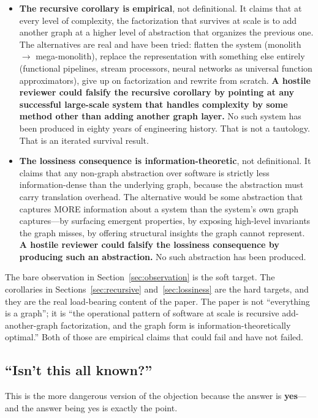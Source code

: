 \documentclass[11pt]{article}
\begin{document}
\begin{itemize}[leftmargin=*]
\item \textbf{The recursive corollary is empirical}, not definitional. It claims that at every level of complexity, the factorization that survives at scale is to add another graph at a higher level of abstraction that organizes the previous one. The alternatives are real and have been tried: flatten the system (monolith $\to$ mega-monolith), replace the representation with something else entirely (functional pipelines, stream processors, neural networks as universal function approximators), give up on factorization and rewrite from scratch. \textbf{A hostile reviewer could falsify the recursive corollary by pointing at any successful large-scale system that handles complexity by some method other than adding another graph layer.} No such system has been produced in eighty years of engineering history. That is not a tautology. That is an iterated survival result.
\item \textbf{The lossiness consequence is information-theoretic}, not definitional. It claims that any non-graph abstraction over software is strictly less information-dense than the underlying graph, because the abstraction must carry translation overhead. The alternative would be some abstraction that captures MORE information about a system than the system's own graph captures---by surfacing emergent properties, by exposing high-level invariants the graph misses, by offering structural insights the graph cannot represent. \textbf{A hostile reviewer could falsify the lossiness consequence by producing such an abstraction.} No such abstraction has been produced.
\end{itemize}

The bare observation in Section~\ref{sec:observation} is the soft target. The corollaries in Sections~\ref{sec:recursive} and~\ref{sec:lossiness} are the hard targets, and they are the real load-bearing content of the paper. The paper is not ``everything is a graph''; it is ``the operational pattern of software at scale is recursive add-another-graph factorization, and the graph form is information-theoretically optimal.'' Both of those are empirical claims that could fail and have not failed.

\subsection*{``Isn't this all known?''}

This is the more dangerous version of the objection because the answer is \textbf{yes}---and the answer being yes is exactly the point.
\end{document}
